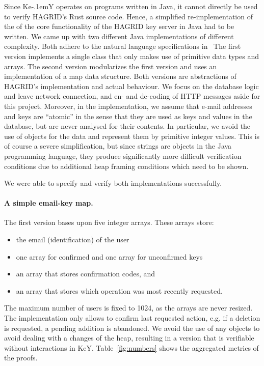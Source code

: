 \documentclass{llncs}
\newcommand{\KeY}{Ke\kern-.1emY\xspace}
\begin{document}
Since \KeY operates on programs written in Java, it cannot directly be
used to verify HAGRID's Rust source code. Hence, a simplified
re-implementation of the of the core functionality of the HAGRID key
server in Java had to be written.
%
We came up with two different Java implementations of different
complexity.
%
Both adhere to the natural language specifications in~\cite{ltcDescr}
%
The first version implements a single class that only
makes use of primitive data types and arrays. The second version
modularizes the first version and uses an implementation of a map data
structure. Both versions are abstractions of HAGRID's implementation
and actual behaviour. We focus on the database logic and leave network
connection, and en- and de-coding of HTTP messages aside for this
project. %
%
Moreover, in the implementation, we assume that e-mail addresses and
keys are ``atomic'' in the sense that they are used as keys and values
in the database, but are never analysed for their contents. In
particular, we avoid the use of objects for the data and represent
them by primitive integer values.
%
This is of course a severe simplification, but since strings are
objects in the Java programming language, they produce significantly
more difficult verification conditions due to additional heap framing
conditions which need to be shown.

We were able to specify and verify both implementations successfully.

\paragraph{A simple email-key map.}
%
The first version bases upon five integer arrays.
These arrays store:
%
\begin{itemize}
  \item the email (identification) of the user
  \item one array for confirmed and one array for unconfirmed keys
  \item an array that stores confirmation codes, and
  \item an array that stores which operation was most recently requested.
\end{itemize}
%
The maximum number of users is fixed to 1024, as the arrays are never resized.
The implementation only allows to confirm last requested action, e.g. if a
deletion is requested, a pending addition is abandoned.
%
We avoid the use of any objects to avoid dealing with a changes of the heap,
resulting in a version that is verifiable without interactions in KeY. 
Table~\ref{fig:numbers} shows the aggregated metrics of the proofs.
\end{document}

